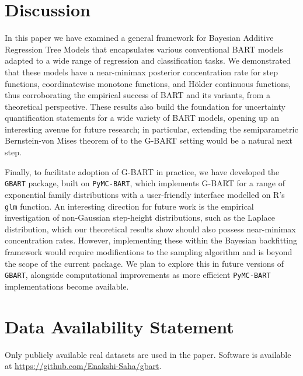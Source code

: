 \documentclass[12pt]{article}
\newcommand{\1}{\mathbb{I}}
\theoremstyle{plain}
\theoremstyle{definition}
\theoremstyle{remark}
\begin{document}
\section{Discussion}\label{sec:discussion}
In this paper we have examined a general framework for Bayesian Additive Regression Tree Models that encapsulates various conventional BART models adapted to a wide range of regression and classification tasks. We demonstrated that these models have a near-minimax posterior concentration rate for step functions, coordinatewise monotone functions, and H\"{o}lder continuous functions, thus corroborating the empirical success of BART and its variants, from a theoretical perspective. These results also build the foundation for uncertainty quantification statements for a wide variety of BART models, opening up an interesting avenue for future research; in particular, extending the semiparametric Bernstein-von Mises theorem of \cite{rockova2020semi} to the G-BART setting would be a natural next step. 

Finally, to facilitate adoption of G-BART in practice, we have developed the \texttt{GBART} package, built on \texttt{PyMC-BART}, which implements G-BART for a range of exponential family distributions with a user-friendly interface modelled on R's \texttt{glm} function. An interesting direction for future work is the empirical investigation of non-Gaussian step-height distributions, such as the Laplace distribution, which our theoretical results show should also possess near-minimax concentration rates. However, implementing these within the Bayesian backfitting framework would require modifications to the sampling algorithm and is beyond the scope of the current package. We plan to explore this in future versions of \texttt{GBART}, alongside computational improvements as more efficient \texttt{PyMC-BART} implementations become available.

\section{Data Availability Statement}
Only publicly available real datasets are used in the paper. Software is available at \url{https://github.com/Enakshi-Saha/gbart}.
\end{document}
